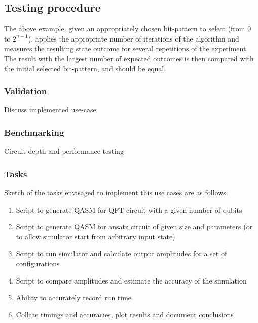 \subsection{Testing procedure}
The above example, given an appropriately chosen bit-pattern to select (from $0$ to $2^{n-1}$), applies the appropriate number of iterations of the algorithm and measures the resulting state outcome for several repetitions of the experiment. The result with the largest number of expected outcomes is then compared with the initial selected bit-pattern, and should be equal. 


\subsubsection{Validation}
Discuss implemented use-case 

\subsubsection{Benchmarking}
Circuit depth and performance testing 

\subsubsection{Tasks}
Sketch of the tasks envisaged to implement this use cases are as follows:

\begin{enumerate}
\item Script to generate QASM for QFT circuit with a given number of qubits
\item Script to generate QASM for ansatz circuit of given size and parameters (or to allow simulator start from arbitrary input state)
\item Script to run simulator and calculate output amplitudes for a set of configurations
\item Script to compare amplitudes and estimate the accuracy of the simulation
\item Ability to accurately record run time
\item Collate timings and accuracies, plot results and document conclusions
\end{enumerate}